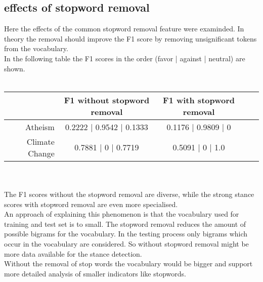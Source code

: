 \documentclass[a4paper,12pt,twoside]{article}
\begin{document}
\subsection{effects of stopword removal}
Here the effects of the common stopword removal feature were examinded. In theory the removal should improve the F1 score by removing unsignificant tokens from the vocabulary.\\
In the following table the F1 scores in the order (favor | against | neutral) are shown.\\
\\
\begin{tabular}{r|cccc}
& F1 without stopword removal &  F1 with stopword removal\\ \hline
Atheism & 0.2222 | 0.9542 | 0.1333 & 0.1176 | 0.9809 | 0\\
Climate Change & 0.7881 | 0 | 0.7719 & 0.5091 | 0 | 1.0 \\
\end{tabular}\\
\\
The F1 scores without the stopword removal are diverse, while the strong stance scores with stopword removal are even more specialised.\\
An approach of explaining this phenomenon is that the vocabulary used for training and test set is to small.
The stopword removal reduces the amount of possible bigrams for the vocabulary.
In the testing process only bigrams which occur in the vocabulary are considered. 
So without stopword removal might be more data available for the stance detection.\\
Without the removal of stop words the vocabulary would be bigger and support more detailed analysis of smaller indicators like stopwords.
\\
\end{document}
